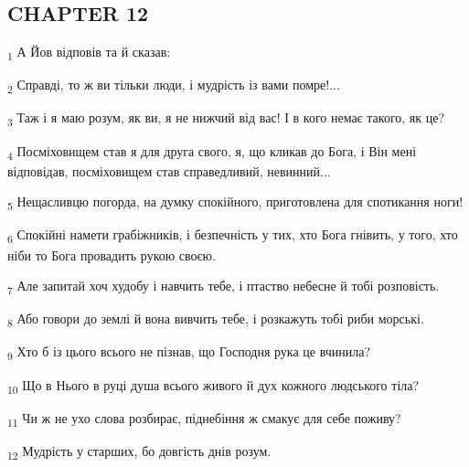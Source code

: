 \subsection{CHAPTER 12}
\begin{tcolorbox}
\textsubscript{1} А Йов відповів та й сказав:
\end{tcolorbox}
\begin{tcolorbox}
\textsubscript{2} Справді, то ж ви тільки люди, і мудрість із вами помре!...
\end{tcolorbox}
\begin{tcolorbox}
\textsubscript{3} Таж і я маю розум, як ви, я не нижчий від вас! І в кого немає такого, як це?
\end{tcolorbox}
\begin{tcolorbox}
\textsubscript{4} Посміховищем став я для друга свого, я, що кликав до Бога, і Він мені відповідав, посміховищем став справедливий, невинний...
\end{tcolorbox}
\begin{tcolorbox}
\textsubscript{5} Нещасливцю погорда, на думку спокійного, приготовлена для спотикання ноги!
\end{tcolorbox}
\begin{tcolorbox}
\textsubscript{6} Спокійні намети грабіжників, і безпечність у тих, хто Бога гнівить, у того, хто ніби то Бога провадить рукою своєю.
\end{tcolorbox}
\begin{tcolorbox}
\textsubscript{7} Але запитай хоч худобу і навчить тебе, і птаство небесне й тобі розповість.
\end{tcolorbox}
\begin{tcolorbox}
\textsubscript{8} Або говори до землі й вона вивчить тебе, і розкажуть тобі риби морські.
\end{tcolorbox}
\begin{tcolorbox}
\textsubscript{9} Хто б із цього всього не пізнав, що Господня рука це вчинила?
\end{tcolorbox}
\begin{tcolorbox}
\textsubscript{10} Що в Нього в руці душа всього живого й дух кожного людського тіла?
\end{tcolorbox}
\begin{tcolorbox}
\textsubscript{11} Чи ж не ухо слова розбирає, піднебіння ж смакує для себе поживу?
\end{tcolorbox}
\begin{tcolorbox}
\textsubscript{12} Мудрість у старших, бо довгість днів розум.
\end{tcolorbox}
